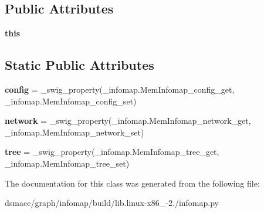 \subsection*{Public Attributes}
\begin{DoxyCompactItemize}
\item 
\mbox{\label{classinfomap_1_1MemInfomap_ae38b278be991d664432465a37b111ad9}} 
{\bfseries this}
\end{DoxyCompactItemize}
\subsection*{Static Public Attributes}
\begin{DoxyCompactItemize}
\item 
\mbox{\label{classinfomap_1_1MemInfomap_aa39753f9ee53c896972d4396a95a598d}} 
{\bfseries config} = \+\_\+swig\+\_\+property(\+\_\+infomap.\+Mem\+Infomap\+\_\+config\+\_\+get, \+\_\+infomap.\+Mem\+Infomap\+\_\+config\+\_\+set)
\item 
\mbox{\label{classinfomap_1_1MemInfomap_adcdb206617487d7434648fcc1f2daa78}} 
{\bfseries network} = \+\_\+swig\+\_\+property(\+\_\+infomap.\+Mem\+Infomap\+\_\+network\+\_\+get, \+\_\+infomap.\+Mem\+Infomap\+\_\+network\+\_\+set)
\item 
\mbox{\label{classinfomap_1_1MemInfomap_ad3264dd7e388a9dac312631993da272c}} 
{\bfseries tree} = \+\_\+swig\+\_\+property(\+\_\+infomap.\+Mem\+Infomap\+\_\+tree\+\_\+get, \+\_\+infomap.\+Mem\+Infomap\+\_\+tree\+\_\+set)
\end{DoxyCompactItemize}


The documentation for this class was generated from the following file\+:\begin{DoxyCompactItemize}
\item 
dsmacc/graph/infomap/build/lib.\+linux-\/x86\+\_-\/2./infomap.\+py\end{DoxyCompactItemize}
